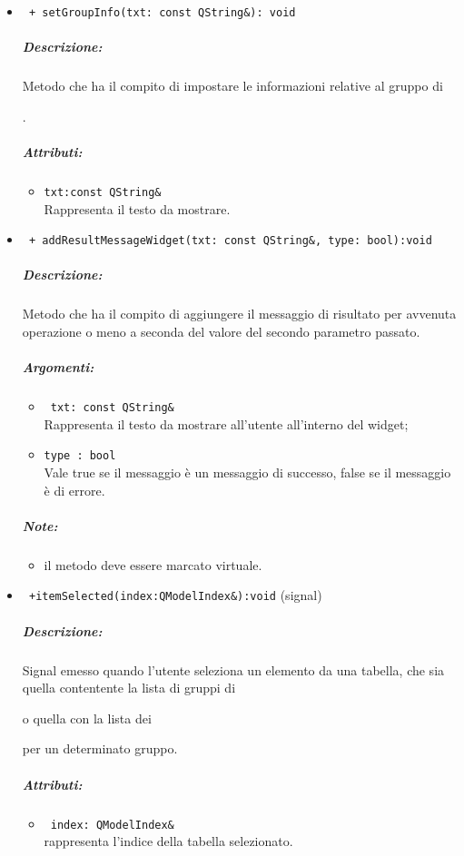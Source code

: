 \begin{itemize}
\item \color{blue} \verb! + setGroupInfo(txt: const QString&): void! 
\color{black}
\subparagraph{Descrizione:} Metodo che ha il compito di impostare le informazioni relative al gruppo di \subject{}.
\subparagraph{Attributi:}
\begin{itemize}
\item \color{RoyalPurple} \verb!txt:const QString& !  \\ Rappresenta il testo da mostrare.
\end{itemize}
\item \color{blue} \verb! + addResultMessageWidget(txt: const QString&, type: bool):void! 
\color{black}
\subparagraph{Descrizione:} Metodo che ha il compito di aggiungere il messaggio di risultato per avvenuta operazione o meno a seconda del valore del secondo parametro passato.
\subparagraph{Argomenti:}
\begin{itemize}
\item \color{RoyalPurple} \verb! txt: const QString& ! \\Rappresenta il testo da mostrare all'utente all'interno del widget;
\item \color{RoyalPurple} \verb!type : bool ! \\ Vale true se il messaggio è un messaggio di successo, false se il messaggio è di errore.
\end{itemize}
\subparagraph{Note:}
\begin{itemize}
\item il metodo deve essere marcato virtuale.
\end{itemize}
\item\color{blue}\verb! +itemSelected(index:QModelIndex&):void! (signal)
\color{black} 
\subparagraph{Descrizione:}
Signal\g{} emesso quando l'utente seleziona un elemento da una tabella, che sia quella contentente la lista di gruppi di \subject{} o quella con la lista dei \subject{} per un determinato gruppo.
\subparagraph{Attributi:}
\begin{itemize}
\item \color{RoyalPurple}\verb! index: QModelIndex& ! \\ rappresenta l'indice della tabella selezionato.
\end{itemize}
\end{itemize}
\pagebreak
\color{black}

